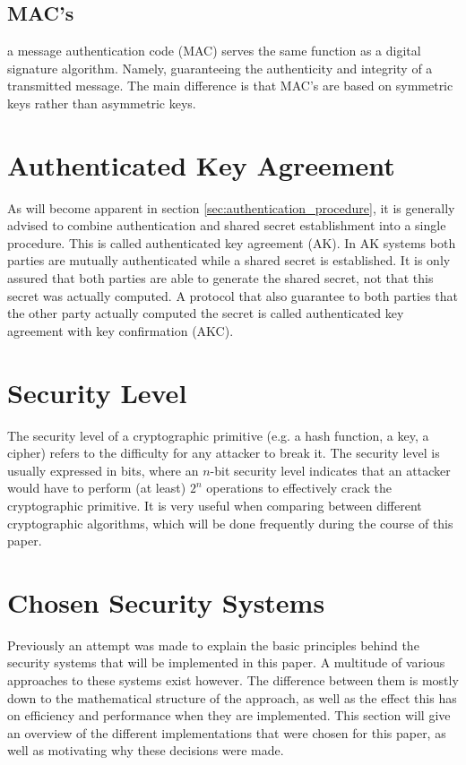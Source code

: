 \subsection{MAC's} 
\label{subsec:MAC}
a message authentication code (MAC) serves the same function as a digital signature algorithm. Namely, guaranteeing the authenticity and integrity of a transmitted message. The main difference is that MAC's are based on symmetric keys rather than asymmetric keys. 

\section{Authenticated Key Agreement}
\label{sec:AK}

As will become apparent in section \ref{sec:authentication_procedure}, it is generally advised to combine authentication and shared secret establishment into a single procedure. This is called authenticated key agreement (AK). In AK systems both parties are mutually authenticated while a shared secret is established. It is only assured that both parties are able to generate the shared secret, not that this secret was actually computed. A protocol that also guarantee to both parties that the other party actually computed the secret is called authenticated key agreement with key confirmation (AKC). \cite{Blake-Wilson}

\section{Security Level}
\label{sec:security_level}

The security level of a cryptographic primitive (e.g. a hash function, a key, a cipher) refers to the difficulty for any attacker to break it. The security level is usually expressed in bits, where  an $n$-bit security level indicates that an attacker would have to perform (at least) $2^n$ operations to effectively crack the cryptographic primitive. It is very useful when comparing between different cryptographic algorithms, which will be done frequently during the course of this paper.

\section{Chosen Security Systems}
Previously an attempt was made to explain the basic principles behind the security systems that will be implemented in this paper. A multitude of various approaches to these systems exist however. The difference between them is mostly down to the mathematical structure of the approach, as well as the effect this has on efficiency and performance when they are implemented. This section will give an overview of the different implementations that were chosen for this paper, as well as motivating why these decisions were made.


